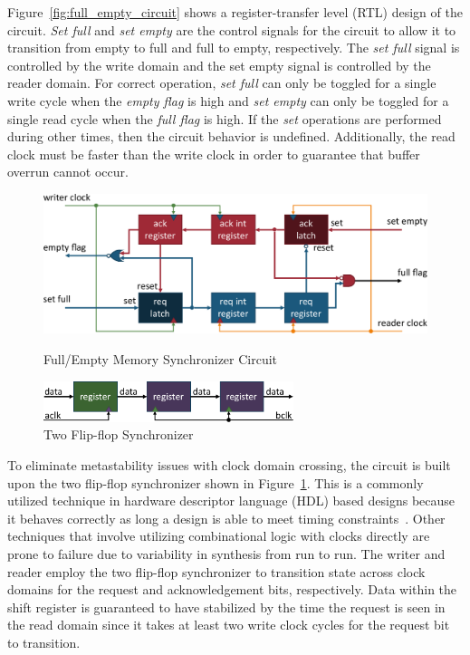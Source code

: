        Figure~\ref{fig:full_empty_circuit} shows a register-transfer level (RTL) design of the circuit. {\it Set full} and {\it set empty} are the control signals for the circuit to allow it to transition from empty to full and full to empty, respectively. The {\it set full} signal is controlled by the write domain and the {set empty} signal is controlled by the reader domain. For correct operation, {\it set full} can only be toggled for a single write cycle when the {\it empty flag} is high and {\it set empty} can only be toggled for a single read cycle when the {\it full flag} is high. If the {\it set} operations are performed during other times, then the circuit behavior is undefined. Additionally, the read clock must be faster than the write clock in order to guarantee that buffer overrun cannot occur.

        \begin{figure}[t]
            \centering
            \includegraphics[width=1.0\textwidth]{fig/full_empty_circuit.pdf}
            \caption{Full/Empty Memory Synchronizer Circuit}
            \label{fig:full_empty_circuit}

            \centering
            \includegraphics[width=0.65\textwidth]{fig/two_flip_flop_synchronizer.pdf}
            \caption{Two Flip-flop Synchronizer}
            \label{fig:two_flip_flop_synchronizer}
        \end{figure}


        To eliminate metastability issues with clock domain crossing, the circuit is built upon the two flip-flop synchronizer shown in Figure~\ref{fig:two_flip_flop_synchronizer}. This is a commonly utilized technique in hardware descriptor language (HDL) based designs because it behaves correctly as long a design is able to meet timing constraints~\cite{Cummings2008, Ginosar2011}. Other techniques that involve utilizing combinational logic with clocks directly are prone to failure due to variability in synthesis from run to run. The writer and reader employ the two flip-flop synchronizer to transition state across clock domains for the request and acknowledgement bits, respectively. Data within the shift register is guaranteed to have stabilized by the time the request is seen in the read domain since it takes at least two write clock cycles for the request bit to transition.

